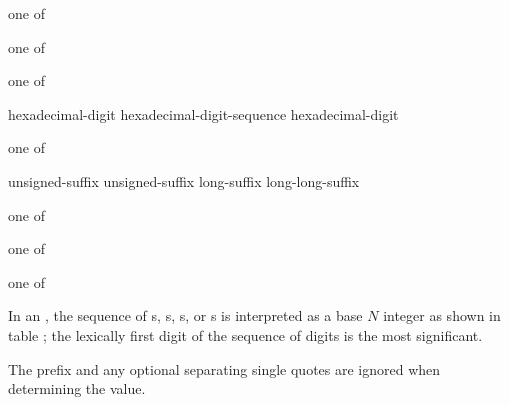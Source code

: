 \begin{bnf}
 \textnormal{one of}\br
\end{bnf}

\begin{bnf}
 \textnormal{one of}\br
\end{bnf}

\begin{bnf}
 \textnormal{one of}\br
\end{bnf}

\begin{bnf}
\br
    hexadecimal-digit\br
    hexadecimal-digit-sequence  hexadecimal-digit
\end{bnf}

\begin{bnf}
 \textnormal{one of}\br
    \br
    \br
\end{bnf}

\begin{bnf}
\br
    unsigned-suffix  \br
    unsigned-suffix  \br
    long-suffix  \br
    long-long-suffix 
\end{bnf}

\begin{bnf}
 \textnormal{one of}\br
\end{bnf}

\begin{bnf}
 \textnormal{one of}\br
\end{bnf}

\begin{bnf}
 \textnormal{one of}\br
\end{bnf}

\pnum
{}%
%
%
In an ,
the sequence of
s,
s,
s, or
s
is interpreted as a base $N$ integer as shown in table ;
the lexically first digit of the sequence of digits is the most significant.
\begin{note}
The prefix and any optional separating single quotes are ignored
when determining the value.
\end{note}

